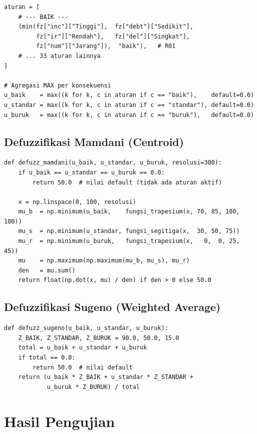 \documentclass[12pt,a4paper]{report}
\begin{document}
\begin{lstlisting}[caption={Inferensi 34 aturan dengan operator AND (minimum)}]
aturan = [
    # --- BAIK ---
    (min(fz["inc"]["Tinggi"],  fz["debt"]["Sedikit"],
         fz["ir"]["Rendah"],   fz["del"]["Singkat"],
         fz["num"]["Jarang"]),  "baik"),   # R01
    # ... 33 aturan lainnya
]

# Agregasi MAX per konsekuensi
u_baik    = max((k for k, c in aturan if c == "baik"),    default=0.0)
u_standar = max((k for k, c in aturan if c == "standar"), default=0.0)
u_buruk   = max((k for k, c in aturan if c == "buruk"),   default=0.0)
\end{lstlisting}

\subsection{Defuzzifikasi Mamdani (Centroid)}

\begin{lstlisting}[caption={Defuzzifikasi Mamdani menggunakan metode Centroid}]
def defuzz_mamdani(u_baik, u_standar, u_buruk, resolusi=300):
    if u_baik == u_standar == u_buruk == 0.0:
        return 50.0  # nilai default (tidak ada aturan aktif)

    x = np.linspace(0, 100, resolusi)
    mu_b  = np.minimum(u_baik,    fungsi_trapesium(x, 70, 85, 100, 100))
    mu_s  = np.minimum(u_standar, fungsi_segitiga(x,  30, 50, 75))
    mu_r  = np.minimum(u_buruk,   fungsi_trapesium(x,   0,  0, 25, 45))
    mu    = np.maximum(np.maximum(mu_b, mu_s), mu_r)
    den   = mu.sum()
    return float(np.dot(x, mu) / den) if den > 0 else 50.0
\end{lstlisting}

\subsection{Defuzzifikasi Sugeno (Weighted Average)}

\begin{lstlisting}[caption={Defuzzifikasi Sugeno menggunakan Weighted Average}]
def defuzz_sugeno(u_baik, u_standar, u_buruk):
    Z_BAIK, Z_STANDAR, Z_BURUK = 90.0, 50.0, 15.0
    total = u_baik + u_standar + u_buruk
    if total == 0.0:
        return 50.0  # nilai default
    return (u_baik * Z_BAIK + u_standar * Z_STANDAR +
            u_buruk * Z_BURUK) / total
\end{lstlisting}

\section{Hasil Pengujian}
\end{document}
